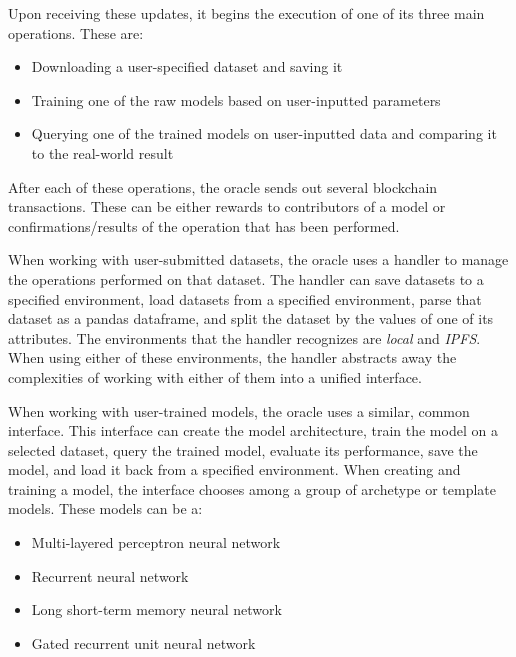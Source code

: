 \documentclass{ledger}
\begin{document}
Upon receiving these updates, it begins the execution of one of its three main operations.  These are:

\begin{itemize}
    \item Downloading a user-specified dataset and saving it
    \item Training one of the raw models based on user-inputted parameters
    \item Querying one of the trained models on user-inputted data and comparing it to the real-world result
\end{itemize}

After each of these operations, the oracle sends out several blockchain transactions.  These can be either
rewards to contributors of a model or confirmations/results of the operation that has been performed.

When working with user-submitted datasets, the oracle uses a handler to manage the operations performed on that dataset.
The handler can save datasets to a specified environment, load datasets from a specified environment, parse that dataset
as a pandas dataframe, and split the dataset by the values of one of its attributes.  The environments that the handler
recognizes are \textit{local} and \textit{IPFS}.  When using either of these environments, the handler abstracts away the
complexities of working with either of them into a unified interface.

When working with user-trained models, the oracle uses a similar, common interface.  This interface can create the model
architecture, train the model on a selected dataset, query the trained model, evaluate its performance, save the model,
and load it back from a specified environment.  When creating and training a model, the interface chooses among a group
of archetype or template models.  These models can be a:

\begin{itemize}
    \item Multi-layered perceptron neural network~\cite{preceptrons}
    \item Recurrent neural network~\cite{RNN}
    \item Long short-term memory neural network~\cite{LSTM}
    \item Gated recurrent unit neural network~\cite{GRU}
\end{itemize}
\end{document}
